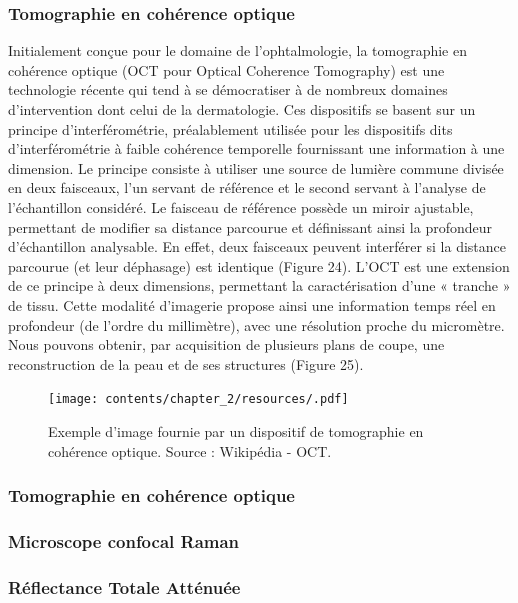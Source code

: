 \subsubsection{Tomographie en cohérence optique}
Initialement conçue pour le domaine de l’ophtalmologie, la tomographie en cohérence optique (OCT pour Optical Coherence Tomography) est une technologie récente qui tend à se démocratiser à de nombreux domaines d’intervention dont celui de la dermatologie. Ces dispositifs se basent sur un principe d’interférométrie, préalablement utilisée pour les dispositifs dits d’interférométrie à faible cohérence temporelle fournissant une information à une dimension. Le principe consiste à utiliser une source de lumière commune divisée en deux faisceaux, l’un servant de référence et le second servant à l’analyse de l’échantillon considéré. Le faisceau de référence possède un miroir ajustable, permettant de modifier sa distance parcourue et définissant ainsi la profondeur d’échantillon analysable. En effet, deux faisceaux peuvent interférer si la distance parcourue (et leur déphasage) est identique (Figure 24).
L’OCT est une extension de ce principe à deux dimensions, permettant la caractérisation d’une « tranche » de tissu. Cette modalité d’imagerie propose ainsi une information temps réel en profondeur (de l’ordre du millimètre), avec une résolution proche du micromètre. Nous pouvons obtenir, par acquisition de plusieurs plans de coupe, une reconstruction de la peau et de ses structures (Figure 25).
\begin{figure}[H]
    \centering
    \texttt{[image: contents/chapter\_2/resources/.pdf]}
    \caption{Exemple d’image fournie par un dispositif de tomographie en cohérence optique. Source : Wikipédia - OCT.}
    \label{fig:statistics}
\end{figure}\par

\subsubsection{Tomographie en cohérence optique}

\subsubsection{Microscope confocal Raman}

\subsubsection{Réflectance Totale Atténuée}

